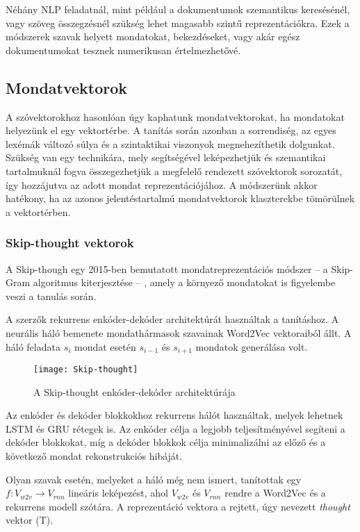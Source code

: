 Néhány NLP feladatnál, mint például a dokumentumok szemantikus keresésénél, vagy szöveg összegzésnél szükség lehet magasabb szintű reprezentációkra.  Ezek a módszerek szavak helyett mondatokat, bekezdéseket, vagy akár egész dokumentumokat tesznek numerikusan értelmezhetővé. 

\subsection{Mondatvektorok}
A szóvektorokhoz hasonlóan úgy kaphatunk mondatvektorokat, ha mondatokat helyezünk el egy vektortérbe. A tanítás során azonban a sorrendiség, az egyes lexémák változó súlya és a szintaktikai viszonyok megnehezíthetik dolgunkat. Szükség van egy technikára, mely segítségével leképezhetjük és szemantikai tartalmuknál fogva összegezhetjük a megfelelő rendezett szóvektorok sorozatát, így hozzájutva az adott mondat reprezentációjához. A módszerünk akkor hatékony, ha az azonos jelentéstartalmú mondatvektorok klaszterekbe tömörülnek a vektortérben.

\subsubsection{Skip-thought vektorok}
A Skip-though egy 2015-ben bemutatott mondatreprezentációs módszer – a Skip-Gram algoritmus kiterjesztése – , amely a környező mondatokat is figyelembe veszi a tanulás során. 

A szerzők rekurrens enkóder-dekóder architektúrát használtak a tanításhoz. A neurális háló bemenete mondathármasok szavainak Word2Vec vektoraiból állt. A háló feladata $s_i$ mondat esetén $s_{i-1}$ és $s_{i+1}$ mondatok generálása volt.

\begin{figure}[H]
	\centering
	\texttt{[image: Skip-thought]}
	\caption{A Skip-thought enkóder-dekóder architektúrája}
\end{figure}

Az enkóder és dekóder blokkokhoz rekurrens hálót használtak, melyek lehetnek LSTM és GRU rétegek is. Az enkóder célja a legjobb teljesítményével segíteni a dekóder blokkokat, míg a dekóder blokkok célja minimalizálni az előző és a következő mondat rekonstrukciós hibáját.


Olyan szavak esetén, melyeket a háló még nem ismert, tanítottak egy $f:V_{w2v} \rightarrow V_{rnn}$ lineáris leképezést, ahol $V_{w2v}$ és $V_{rnn}$ rendre a Word2Vec és a rekurrens modell szótára. A reprezentáció vektora a rejtett, úgy nevezett \textit{thought} vektor (T).


